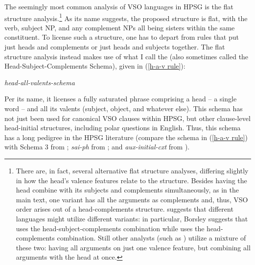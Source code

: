 \documentclass[output=paper
	        ,collection
	        ,collectionchapter
 	        ,biblatex
                ,babelshorthands
                ,newtxmath
                ,draftmode
                ,colorlinks, citecolor=brown
]{langscibook}
\begin{document}
The seemingly most common analysis of VSO languages  in HPSG is the flat structure analysis.\footnote{There are, in fact, several alternative flat structure analyses, differing slightly in how the head's valence features relate to the structure. Besides having the head combine with its subjects and complements simultaneously, as in the main text, one variant has all the arguments as complements and, thus, VSO order arises out of a head-complements structure. \citet{borsley95} suggests that different languages might utilize different variants: in particular, Borsley suggests that  uses the head-subject-complements combination while  uses the head-complements combination. Still other analysts (such as \citealt{ball08thesis,ball17}) utilize a mixture of these two: having all arguments on just one valence feature, but combining all arguments with the head at once.} As its name suggests, the proposed structure is flat, with the verb, subject NP, and any complement NPs all being sisters within the same constituent. To license such a structure, one has to depart from rules that put just heads and complements or just heads and subjects together. The flat structure analysis instead makes use of what I call the  (also sometimes called the Head-Subject-Complements Schema), given in (\ref{h-a-v rule}):   
%
\begin{samepage}
\begin{exe}
\ex \label{h-a-v rule}
\emph{head-all-valents-schema} \impl  \\
\end{exe}
\end{samepage}
%
Per its name, it licenses a fully saturated phrase comprising a head -- a single word -- and all its valents (subject, object, and whatever else). This schema has not just been used for canonical VSO clauses within HPSG, but other clause-level head-initial structures, including polar questions in English. Thus, this schema has a long pedigree in the HPSG literature (compare the schema in (\ref{h-a-v rule}) with Schema 3 from \citealt[40]{ps2}; \textit{sai-ph} from \citealt[36]{GSag2000a-u}; and \textit{aux-initial-cxt} from \citealt[188]{Sag2012a}).
 
\end{document}
